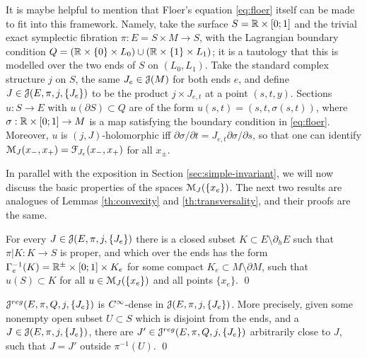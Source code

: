 \documentclass[10pt,letterpaper]{article}
\begin{document}
\begin{remark}
It is maybe helpful to mention that Floer's equation \eqref{eq:floer} itself
can be made to fit into this framework. Namely, take the surface $S = \mathbb{R} \times
[0;1]$ and the trivial exact symplectic fibration $\pi: E = S \times M
\rightarrow S$, with the Lagrangian boundary condition $Q = (\mathbb{R} \times \{0\}
\times L_0) \cup (\mathbb{R} \times \{1\} \times L_1)$; it is a tautology that this is
modelled over the two ends of $S$ on $(L_0,L_1)$. Take the standard complex
structure $j$ on $S$, the same $J_e \in \mathcal{J}(M)$ for both ends $e$, and define
$J \in \mathcal{J}(E,\pi,j,\{J_e\})$ to be the product $j \times J_{e,t}$ at a point
$(s,t,y)$. Sections $u: S \rightarrow E$ with $u(\partial S) \subset Q$ are of
the form $u(s,t) = (s,t,\sigma(s,t))$, where $\sigma: \mathbb{R} \times [0;1]
\rightarrow M$ is a map satisfying the boundary condition in \eqref{eq:floer}.
Moreover, $u$ is $(j,J)$-holomorphic iff $\partial\sigma/\partial t = J_{e,t}
\partial\sigma/\partial s$, so that one can identify $\mathcal{M}_J(x_-,x_+) =
\mathcal{F}_{J_e}(x_-,x_+)$ for all $x_{\pm}$.
\end{remark}

In parallel with the exposition in Section \ref{sec:simple-invariant}, we will
now discuss the basic properties of the spaces $\mathcal{M}_J(\{x_e\})$. The next two
results are analogues of Lemmas \ref{th:convexity} and \ref{th:transversality},
and their proofs are the same.

\begin{lemma} \label{th:relative-convexity}
For every $J \in \mathcal{J}(E,\pi,j,\{J_e\})$ there is a closed subset $K \subset E
\setminus \partial_hE$ such that $\pi|K : K \rightarrow S$ is proper, and which
over the ends has the form $\Gamma_e^{-1}(K) = \mathbb{R}^{\pm} \times [0;1] \times
K_e$ for some compact $K_e \subset M \setminus \partial M$, such that $u(S)
\subset K$ for all $u \in \mathcal{M}_J(\{x_e\})$ and all points $\{x_e\}$. \qed
\end{lemma}

\begin{lemma} \label{th:relative-transversality}
$\mathcal{J}^{reg}(E,\pi,Q,j,\{J_e\})$ is $C^\infty$-dense in $\mathcal{J}(E,\pi,j,\{J_e\})$. More
precisely, given some nonempty open subset $U \subset S$ which is disjoint from
the ends, and a $J \in \mathcal{J}(E,\pi,j,\{J_e\})$, there are $J' \in
\mathcal{J}^{reg}(E,\pi,Q,j,\{J_e\})$ arbitrarily close to $J$, such that $J = J'$ outside
$\pi^{-1}(U)$. \qed
\end{lemma}
\end{document}
